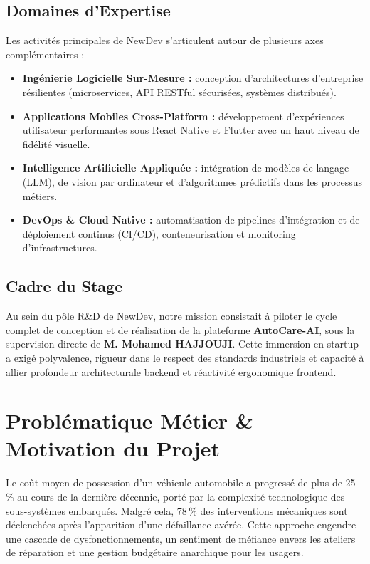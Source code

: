 \documentclass[12pt,a4paper,twoside,openright]{report}
\newcommand{\itembullet}{\textcolor{secondaryBlue}{$\blacktriangleright$}}
\begin{document}
  \subsection{Domaines d'Expertise}
  Les activit\'es principales de NewDev s'articulent autour de plusieurs axes compl\'ementaires :
  \begin{itemize}[label=\itembullet]
    \item \textbf{Ing\'enierie Logicielle Sur-Mesure :} conception d'architectures d'entreprise r\'esilientes (microservices, API RESTful s\'ecuris\'ees, syst\`emes distribu\'es).
    \item \textbf{Applications Mobiles Cross-Platform :} d\'eveloppement d'exp\'eriences utilisateur performantes sous React Native et Flutter avec un haut niveau de fid\'elit\'e visuelle.
    \item \textbf{Intelligence Artificielle Appliqu\'ee :} int\'egration de mod\`eles de langage (LLM), de vision par ordinateur et d'algorithmes pr\'edictifs dans les processus m\'etiers.
    \item \textbf{DevOps \& Cloud Native :} automatisation de pipelines d'int\'egration et de d\'eploiement continus (CI/CD), conteneurisation et monitoring d'infrastructures.
  \end{itemize}

  \subsection{Cadre du Stage}
  Au sein du p\^ole R\&D de NewDev, notre mission consistait \`a piloter le cycle complet de conception et de r\'ealisation de la plateforme \textbf{AutoCare-AI}, sous la supervision directe de \textbf{M. Mohamed HAJJOUJI}. Cette immersion en startup a exig\'e polyvalence, rigueur dans le respect des standards industriels et capacit\'e \`a allier profondeur architecturale backend et r\'eactivit\'e ergonomique frontend.

  \section{Probl\'ematique M\'etier \& Motivation du Projet}
  \begin{problemBox}
  Le co\^ut moyen de possession d'un v\'ehicule automobile a progress\'e de plus de 25\,\% au cours de la derni\`ere d\'ecennie, port\'e par la complexit\'e technologique des sous-syst\`emes embarqu\'es. Malgr\'e cela, 78\,\% des interventions m\'ecaniques sont d\'eclench\'ees apr\`es l'apparition d'une d\'efaillance av\'er\'ee. Cette approche engendre une cascade de dysfonctionnements, un sentiment de m\'efiance envers les ateliers de r\'eparation et une gestion budg\'etaire anarchique pour les usagers.
  \end{problemBox}
\end{document}
